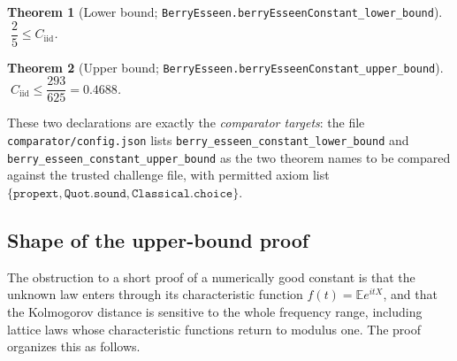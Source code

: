 \documentclass[10pt,a4paper]{article}
\theoremstyle{plain}
\newtheorem{theorem}{Theorem}[section]
\theoremstyle{definition}
\newcommand{\E}{\mathbb{E}}
\newcommand{\Cii}{C_{\mathrm{iid}}}
\newcommand{\lean}[1]{\texttt{#1}}
\newcommand{\file}[1]{\texttt{#1}}
\begin{document}
\begin{theorem}[Lower bound; \lean{BerryEsseen.berryEsseenConstant\_lower\_bound}]
\label{thm:main-lower}
$\;\dfrac{2}{5} \le \Cii$.
\end{theorem}

\begin{theorem}[Upper bound; \lean{BerryEsseen.berryEsseenConstant\_upper\_bound}]
\label{thm:main-upper}
$\;\Cii \le \dfrac{293}{625} = 0.4688$.
\end{theorem}

These two declarations are exactly the \emph{comparator targets}: the file
\file{comparator/config.json} lists \lean{berry\_esseen\_constant\_lower\_bound}
and \lean{berry\_esseen\_constant\_upper\_bound} as the two theorem names to be
compared against the trusted challenge file, with permitted axiom list
$\{\lean{propext},\lean{Quot.sound},\lean{Classical.choice}\}$.

\subsection{Shape of the upper-bound proof}

The obstruction to a short proof of a numerically good constant is that the
unknown law enters through its characteristic function $f(t)=\E e^{itX}$, and
that the Kolmogorov distance is sensitive to the whole frequency range,
including lattice laws whose characteristic functions return to modulus one.
The proof organizes this as follows.
\end{document}
